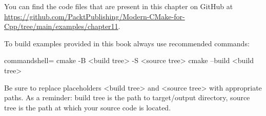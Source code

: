 You can find the code files that are present in this chapter on GitHub at \url{https://github.com/PacktPublishing/Modern-CMake-for-Cpp/tree/main/examples/chapter11}.

To build examples provided in this book always use recommended commands:

\begin{tcblisting}{commandshell={}}
cmake -B <build tree> -S <source tree>
cmake --build <build tree>
\end{tcblisting}

Be sure to replace placeholders <build tree> and <source tree> with appropriate paths. As a reminder: build tree is the path to target/output directory, source tree is the path at which your source code is located.